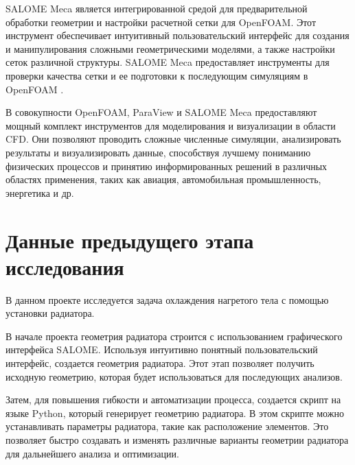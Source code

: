 \documentclass[a4paper,12pt]{article}
\theoremstyle{plain} %
\theoremstyle{definition} %
\theoremstyle{remark} %
\begin{document}
SALOME Meca является интегрированной средой для предварительной обработки геометрии и настройки расчетной сетки для OpenFOAM. Этот инструмент обеспечивает интуитивный пользовательский интерфейс для создания и манипулирования сложными геометрическими моделями, а также настройки сеток различной структуры. SALOME Meca предоставляет инструменты для проверки качества сетки и ее подготовки к последующим симуляциям в OpenFOAM \cite{wOfDocSalome}.

В совокупности OpenFOAM, ParaView и SALOME Meca предоставляют мощный комплект инструментов для моделирования и визуализации в области CFD. Они позволяют проводить сложные численные симуляции, анализировать результаты и визуализировать данные, способствуя лучшему пониманию физических процессов и принятию информированных решений в различных областях применения, таких как авиация, автомобильная промышленность, энергетика и др.

\newpage
\section{Данные предыдущего этапа исследования}

В данном проекте исследуется задача охлаждения нагретого тела с помощью установки радиатора.

В начале проекта геометрия радиатора строится с использованием графического интерфейса SALOME. Используя интуитивно понятный пользовательский интерфейс, создается геометрия радиатора. Этот этап позволяет получить исходную геометрию, которая будет использоваться для последующих анализов.

Затем, для повышения гибкости и автоматизации процесса, создается скрипт на языке Python, который генерирует геометрию радиатора. В этом скрипте можно устанавливать параметры радиатора, такие как расположение элементов. Это позволяет быстро создавать и изменять различные варианты геометрии радиатора для дальнейшего анализа и оптимизации.
\end{document}
